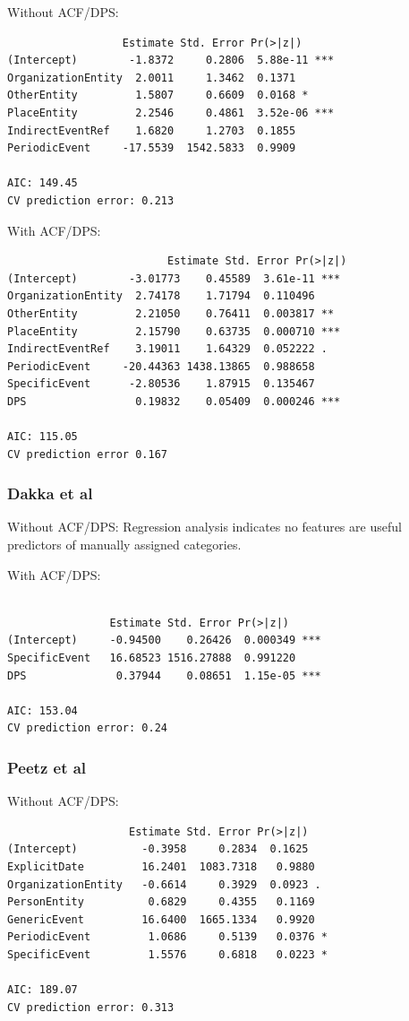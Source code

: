 \documentclass{sig-alternate}
\begin{document}
Without ACF/DPS:
\begin{verbatim}
                  Estimate Std. Error Pr(>|z|)    
(Intercept)        -1.8372     0.2806  5.88e-11 ***
OrganizationEntity  2.0011     1.3462  0.1371    
OtherEntity         1.5807     0.6609  0.0168 *  
PlaceEntity         2.2546     0.4861  3.52e-06 ***
IndirectEventRef    1.6820     1.2703  0.1855    
PeriodicEvent     -17.5539  1542.5833  0.9909    

AIC: 149.45
CV prediction error: 0.213
\end{verbatim}

With ACF/DPS:
\begin{verbatim}
                         Estimate Std. Error Pr(>|z|)    
(Intercept)        -3.01773    0.45589  3.61e-11 ***
OrganizationEntity  2.74178    1.71794  0.110496    
OtherEntity         2.21050    0.76411  0.003817 ** 
PlaceEntity         2.15790    0.63735  0.000710 ***
IndirectEventRef    3.19011    1.64329  0.052222 .  
PeriodicEvent     -20.44363 1438.13865  0.988658    
SpecificEvent      -2.80536    1.87915  0.135467    
DPS                 0.19832    0.05409  0.000246 ***

AIC: 115.05
CV prediction error 0.167
\end{verbatim}

\subsubsection{Dakka et al}

Without ACF/DPS: Regression analysis indicates no features are useful predictors of manually assigned categories.


With ACF/DPS:
\begin{verbatim}

                Estimate Std. Error Pr(>|z|)    
(Intercept)     -0.94500    0.26426  0.000349 ***
SpecificEvent   16.68523 1516.27888  0.991220    
DPS              0.37944    0.08651  1.15e-05 ***

AIC: 153.04
CV prediction error: 0.24
\end{verbatim}

\subsubsection{Peetz et al}


Without ACF/DPS:
\begin{verbatim}
                   Estimate Std. Error Pr(>|z|)  
(Intercept)          -0.3958     0.2834  0.1625  
ExplicitDate         16.2401  1083.7318   0.9880  
OrganizationEntity   -0.6614     0.3929  0.0923 .
PersonEntity          0.6829     0.4355   0.1169  
GenericEvent         16.6400  1665.1334   0.9920  
PeriodicEvent         1.0686     0.5139   0.0376 *
SpecificEvent         1.5576     0.6818   0.0223 *

AIC: 189.07
CV prediction error: 0.313
\end{verbatim}
\end{document}
